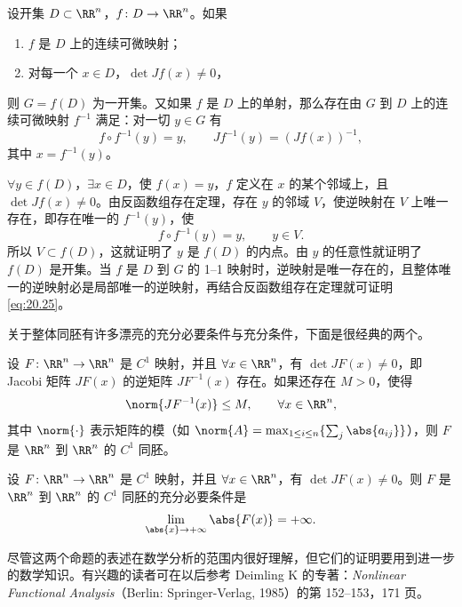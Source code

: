 \begin{xproposition}[20.4.2]
设开集 $D\subset\RR^n$，$f\colon D\to\RR^n$。如果
\begin{enumerate}[label=(\arabic*)]
  \item $f$ 是 $D$ 上的连续可微映射；
  \item 对每一个 $x\in D$，$\det Jf(x)\ne0$，
\end{enumerate}
则 $G=f(D)$ 为一开集。又如果 $f$ 是 $D$ 上的单射，那么存在由 $G$ 到 $D$ 上的连续可微映射 $f^{-1}$ 满足：对一切 $y\in G$ 有
\begin{equation}
  f\circ f^{-1}(y)=y,\qquad
  Jf^{-1}(y)=(Jf(x))^{-1},
  \tag{20.25}
  \label{eq:20.25}
\end{equation}
其中 $x=f^{-1}(y)$。
\end{xproposition}
\begin{xproof}
$\forall y\in f(D)$，$\exists x\in D$，使 $f(x)=y$，$f$ 定义在 $x$ 的某个邻域上，且 $\det Jf(x)\ne0$。由反函数组存在定理，存在 $y$ 的邻域 $V$，使逆映射在 $V$ 上唯一存在，即存在唯一的 $f^{-1}(y)$，使
\[
  f\circ f^{-1}(y)=y,\qquad y\in V.
\]
所以 $V\subset f(D)$，这就证明了 $y$ 是 $f(D)$ 的内点。由 $y$ 的任意性就证明了 $f(D)$ 是开集。当 $f$ 是 $D$ 到 $G$ 的 1--1 映射时，逆映射是唯一存在的，且整体唯一的逆映射必是局部唯一的逆映射，再结合反函数组存在定理就可证明 \eqref{eq:20.25}。
\end{xproof}

关于整体同胚有许多漂亮的充分必要条件与充分条件，下面是很经典的两个。

\begin{xproposition}[20.4.3（Hadamard 定理）]
设 $F\colon\RR^n\to\RR^n$ 是 $C^1$ 映射，并且 $\forall x\in\RR^n$，有 $\det JF(x)\ne0$，即 Jacobi 矩阵 $JF(x)$ 的逆矩阵 $JF^{-1}(x)$ 存在。如果还存在 $M>0$，使得
\[
  \norm{JF^{-1}(x)}\le M,\qquad \forall x\in\RR^n,
\]
其中 $\norm{\cdot}$ 表示矩阵的模（如 $\norm{A}=\max_{1\le i\le n}\{\sum_j\abs{a_{ij}}\}$），则 $F$ 是 $\RR^n$ 到 $\RR^n$ 的 $C^1$ 同胚。
\end{xproposition}

\begin{xproposition}[20.4.4]
设 $F\colon\RR^n\to\RR^n$ 是 $C^1$ 映射，并且 $\forall x\in\RR^n$，有 $\det JF(x)\ne0$。则 $F$ 是 $\RR^n$ 到 $\RR^n$ 的 $C^1$ 同胚的充分必要条件是
\[
  \lim_{\abs{x}\to+\infty}\abs{F(x)}=+\infty.
\]
\end{xproposition}

尽管这两个命题的表述在数学分析的范围内很好理解，但它们的证明要用到进一步的数学知识。有兴趣的读者可在以后参考 Deimling K 的专著：\textit{Nonlinear Functional Analysis}（Berlin: Springer-Verlag, 1985）的第 152--153，171 页。

